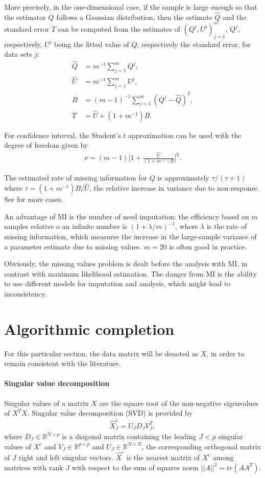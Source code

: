More precisely, in the one-dimensional case, if the sample is large enough so
that the estimator $Q$ follows a Gaussian distribution, then the estimate
$\hat Q$ and the standard error $T$ can be computed from the estimates of
$(Q^j, U^j)_{j=1}^m$, $Q^j$, respectively, $U^j$ being the fitted value of $Q$,
respectively the standard error, for data sets $j$:
\begin{align*}
  \hat Q & = m^{-1} \sum_{j=1}^m Q^j, \\
  \hat U & = m^{-1} \sum_{j=1}^m U^j, \\
  B & = (m-1)^{-1}\sum_{j=1}^m(Q^j - \hat Q)^2, \\
  T & = \hat U + (1 + m^{-1}) B.
\end{align*}

For confidence interval, the Student's $t$ approximation can be used with the
degree of freedom given by
\begin{align*}
\nu = (m-1)\Big[1 + \frac{\hat U}{(1 + m^{-1})B} \Big]^2.
\end{align*}

The estimated rate of missing information for $Q$ is approximately
$\tau/(\tau+1)$ where $\tau = (1 + m^{-1})B/\hat U$, the relative increase in
variance due to non-response. See \cite{schafer1997analysis} for more cases.

An advantage of MI is the number of need imputation: the efficiency based on
$m$ samples relative o an infinite number is $(1 + \lambda/m)^{-1}$, where
$\lambda$ is the rate of missing information, which measures the increase in
the large-sample variance of a parameter estimate due to missing values. $m=20$
is often good in practice.

Obviously, the missing values problem is dealt before the analysis with MI, in
contrast with maximum likelihood estimation. The danger from MI is the ability
to use different models for imputation and analysis, which might lead to
inconsistency.

\section{Algorithmic completion}
\label{sec:compl-case}
For this particular section, the data matrix will be denoted as $X$, in order
to remain consistent with the literature.

\paragraph{Singular value decomposition} Singular values of a matrix $X$ are
the square root of the non-negative eigenvalues of $X^TX$. Singular value
decomposition (SVD) is provided by
\begin{align}\label{eq:svd}
\hat X^c_J = U_JD_JV_J^T,
\end{align}
where $D_J \in \mathbb{R}^{N \times p}$ is a diagonal matrix containing the
leading $J < p$ singular values of $X^c$ and $V_J \in \mathbb{R}^{p \times p}$
and $U_J \in \mathbb{R}^{N \times N}$, the corresponding orthogonal matrix of
$J$ right and left singular vectors. $\hat X^c$ is the nearest matrix of $X^c$
among matrices with rank $J$ with respect to the sum of squares norm $\vert
\vert A \vert \vert ^2 = tr(AA^T)$.

